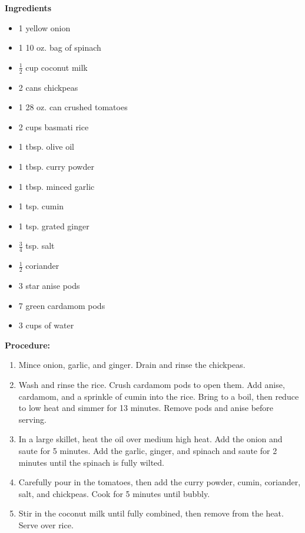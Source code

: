 \begin{multicols}{2}
\textbf{Ingredients}
\begin{itemize}
\item 1 yellow onion 
\item 1 10 oz. bag of spinach 
\item $\frac{1}{2}$ cup coconut milk 
\item 2 cans chickpeas
\item 1 28 oz. can crushed tomatoes 
\item 2 cups basmati rice 
\item 1 tbsp. olive oil 
\item 1 tbsp. curry powder
\item 1 tbsp. minced garlic
\item 1 tsp. cumin
\item 1 tsp. grated ginger
\item $\frac{3}{4}$ tsp. salt 
\item $\frac{1}{2}$ coriander
\item 3 star anise pods
\item 7 green cardamom pods
\item 3 cups of water 


\end{itemize}


\columnbreak
\textbf{Procedure:}
\medskip


\begin{enumerate}
\item Mince onion, garlic, and ginger. Drain and rinse the chickpeas. 
\item Wash and rinse the rice. Crush cardamom pods to open them. Add anise, cardamom, and a sprinkle of cumin into the rice. Bring to a boil, then reduce to low heat and simmer for 13 minutes. Remove pods and anise before serving. 
\item In a large skillet, heat the oil over medium high heat. Add the onion and saute for 5 minutes. Add the garlic, ginger, and spinach and saute for 2 minutes until the spinach is fully wilted.
\item Carefully pour in the tomatoes, then add the curry powder, cumin, coriander, salt, and chickpeas. Cook for 5 minutes until bubbly.
\item Stir in the coconut milk until fully combined, then remove from the heat. Serve over rice.



\end{enumerate}

\end{multicols}




